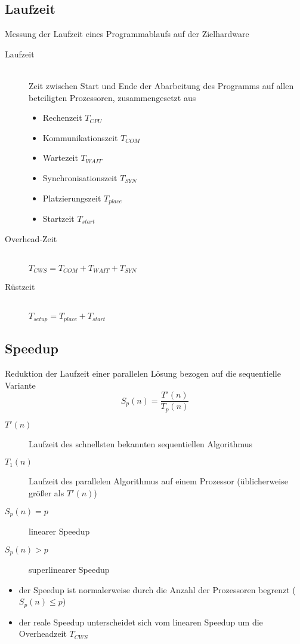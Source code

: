\documentclass[a4paper, 12pt]{article}
\begin{document}
\subsection{Laufzeit}
Messung der Laufzeit eines Programmablaufs auf der Zielhardware
\begin{description}
  \item[Laufzeit]~\\
    Zeit zwischen Start und Ende der Abarbeitung des Programms auf allen beteiligten Prozessoren, zusammengesetzt aus
    \begin{itemize}
      \item Rechenzeit \(T_{CPU}\)
      \item Kommunikationszeit \(T_{COM}\)
      \item Wartezeit \(T_{WAIT}\)
      \item Synchronisationszeit \(T_{SYN}\)
      \item Platzierungszeit \(T_{place}\)
      \item Startzeit \(T_{start}\)
    \end{itemize}
  \item[Overhead-Zeit]~\\
    \(T_{CWS}=T_{COM}+T_{WAIT}+T_{SYN}\)
  \item[Rüstzeit]~\\
    \(T_{setup}=T_{place}+T_{start}\)
\end{description}


\subsection{Speedup}
Reduktion der Laufzeit einer parallelen Lösung bezogen auf die sequentielle Variante
\[
S_p(n) = \frac{T'(n)}{T_p(n)}
\]
\begin{description}
  \item[\(T'(n)\)] Laufzeit des schnellsten bekannten sequentiellen Algorithmus
  \item[\(T_1(n)\)] Laufzeit des parallelen Algorithmus auf einem Prozessor (üblicherweise größer als \(T'(n)\))
  \item[\(S_p(n)=p\)] linearer Speedup
  \item[\(S_p(n)>p\)] superlinearer Speedup
\end{description}
\begin{itemize}
  \item der Speedup ist normalerweise durch die Anzahl der Prozessoren begrenzt (\(S_p(n)\le p\))
  \item der reale Speedup unterscheidet sich vom linearen Speedup um die Overheadzeit \(T_{CWS}\)
\end{itemize}
\end{document}
